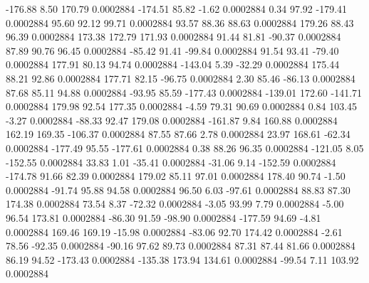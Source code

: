     -176.88        8.50      170.79     0.0002884
     -174.51       85.82       -1.62     0.0002884
        0.34       97.92     -179.41     0.0002884
       95.60       92.12       99.71     0.0002884
       93.57       88.36       88.63     0.0002884
      179.26       88.43       96.39     0.0002884
      173.38      172.79      171.93     0.0002884
       91.44       81.81      -90.37     0.0002884
       87.89       90.76       96.45     0.0002884
      -85.42       91.41      -99.84     0.0002884
       91.54       93.41      -79.40     0.0002884
      177.91       80.13       94.74     0.0002884
     -143.04        5.39      -32.29     0.0002884
      175.44       88.21       92.86     0.0002884
      177.71       82.15      -96.75     0.0002884
        2.30       85.46      -86.13     0.0002884
       87.68       85.11       94.88     0.0002884
      -93.95       85.59     -177.43     0.0002884
     -139.01      172.60     -141.71     0.0002884
      179.98       92.54      177.35     0.0002884
       -4.59       79.31       90.69     0.0002884
        0.84      103.45       -3.27     0.0002884
      -88.33       92.47      179.08     0.0002884
     -161.87        9.84      160.88     0.0002884
      162.19      169.35     -106.37     0.0002884
       87.55       87.66        2.78     0.0002884
       23.97      168.61      -62.34     0.0002884
     -177.49       95.55     -177.61     0.0002884
        0.38       88.26       96.35     0.0002884
     -121.05        8.05     -152.55     0.0002884
       33.83        1.01      -35.41     0.0002884
      -31.06        9.14     -152.59     0.0002884
     -174.78       91.66       82.39     0.0002884
      179.02       85.11       97.01     0.0002884
      178.40       90.74       -1.50     0.0002884
      -91.74       95.88       94.58     0.0002884
       96.50        6.03      -97.61     0.0002884
       88.83       87.30      174.38     0.0002884
       73.54        8.37      -72.32     0.0002884
       -3.05       93.99        7.79     0.0002884
       -5.00       96.54      173.81     0.0002884
      -86.30       91.59      -98.90     0.0002884
     -177.59       94.69       -4.81     0.0002884
      169.46      169.19      -15.98     0.0002884
      -83.06       92.70      174.42     0.0002884
       -2.61       78.56      -92.35     0.0002884
      -90.16       97.62       89.73     0.0002884
       87.31       87.44       81.66     0.0002884
       86.19       94.52     -173.43     0.0002884
     -135.38      173.94      134.61     0.0002884
      -99.54        7.11      103.92     0.0002884
